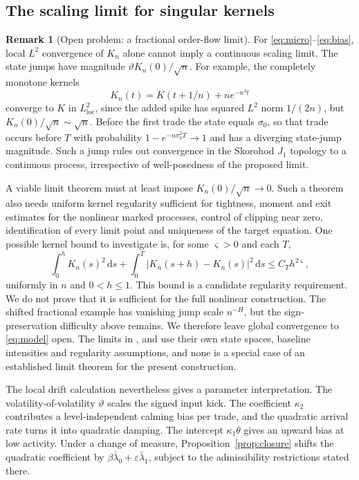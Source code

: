 \documentclass[11pt,a4paper]{article}
\theoremstyle{definition}
\newtheorem{remark}[theorem]{Remark}
\newcommand{\D}{\mathrm{d}}
\begin{document}
\subsection{The scaling limit for singular kernels}\label{sec:micro_limit}

\begin{remark}[Open problem: a fractional order-flow limit]\label{conj:limit}
For \eqref{eq:micro}--\eqref{eq:bias}, local $L^2$ convergence of $K_n$ alone cannot imply a continuous scaling limit. The state jumps have magnitude $\vartheta K_n(0)/\sqrt n$. For example, the completely monotone kernels
\begin{equation*}
K_n(t)=K(t+1/n)+n e^{-n^3t}
\end{equation*}
converge to $K$ in $L^2_{\mathrm{loc}}$, since the added spike has squared $L^2$ norm $1/(2n)$, but $K_n(0)/\sqrt n\sim\sqrt n$. Before the first trade the state equals $\sigma_0$, so that trade occurs before $T$ with probability $1-e^{-n\sigma_0^2T}\to1$ and has a diverging state-jump magnitude. Such a jump rules out convergence in the Skorohod $J_1$ topology to a continuous process, irrespective of well-posedness of the proposed limit.
\end{remark}

A viable limit theorem must at least impose $K_n(0)/\sqrt n\to0$. Such a theorem also needs uniform kernel regularity sufficient for tightness, moment and exit estimates for the nonlinear marked processes, control of clipping near zero, identification of every limit point and uniqueness of the target equation. One possible kernel bound to investigate is, for some $\varsigma>0$ and each $T$,
\begin{equation*}
\int_0^h K_n(s)^2\,\D s+\int_0^T|K_n(s+h)-K_n(s)|^2\,\D s\le C_T h^{2\varsigma},
\end{equation*}
uniformly in $n$ and $0<h\le1$. This bound is a candidate regularity requirement. We do not prove that it is sufficient for the full nonlinear construction. The shifted fractional example has vanishing jump scale $n^{-H}$, but the sign-preservation difficulty above remains. We therefore leave global convergence to \eqref{eq:model} open. The limits in \citet{DandapaniJusselinRosenbaum2021}, \citet{HorstXuZhang2024} and \citet{HagerHorstWagenhoferXu2026} use their own state spaces, baseline intensities and regularity assumptions, and none is a special case of an established limit theorem for the present construction.

The local drift calculation nevertheless gives a parameter interpretation. The volatility-of-volatility $\vartheta$ scales the signed input kick. The coefficient $\kappa_2$ contributes a level-independent calming bias per trade, and the quadratic arrival rate turns it into quadratic damping. The intercept $\kappa_1\theta$ gives an upward bias at low activity. Under a change of measure, Proposition~\ref{prop:closure} shifts the quadratic coefficient by $\beta\bar\lambda_0+\varepsilon\bar\lambda_1$, subject to the admissibility restrictions stated there.
\end{document}
